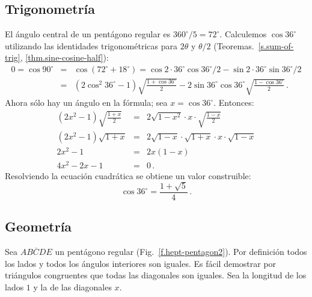 \subsection{Trigonometría}
El ángulo central de un pentágono regular es $360^\circ/5=72^\circ$. Calculemos $\cos 36^\circ$ utilizando las identidades trigonométricas para $2\theta$ y $\theta/2$ (Teoremas.~\ref{s.sum-of-trig}, \ref{thm.sine-cosine-half}):
\begin{eqnarray*}
0=\cos 90^\circ &=& \cos(72^\circ+18^\circ)=\cos 2\cdot 36^\circ\cos 36^\circ/2 - \sin 2\cdot 36^\circ\sin 36^\circ/2\\
&=&(2\cos^2 36^\circ-1)\sqrt{\frac{1+\cos 36^\circ}{2}}-2\sin 36^\circ\cos 36^\circ\sqrt{\frac{1-\cos 36^\circ}{2}}\,.
\end{eqnarray*}
Ahora sólo hay un ángulo en la fórmula; sea $x=\cos 36^\circ$. Entonces:
\begin{eqnarray*}
(2x^2-1)\sqrt{\frac{1+x}{2}}&=&2\sqrt{1-x^2}\cdot x \cdot \sqrt{\frac{1-x}{2}}\\
(2x^2-1)\sqrt{1+x}&=&2\sqrt{1-x}\cdot\sqrt{1+x}\cdot x \cdot \sqrt{1-x}\\
2x^2-1&=&2x(1-x)\\
4x^2-2x-1&=&0\,.
\end{eqnarray*}
Resolviendo la ecuación cuadrática se obtiene un valor construible:
\[
\cos 36^\circ = \frac{1+\sqrt{5}}{4}\,.
\]

\subsection{Geometría}\label{s.geometry-pentagon}

Sea $\overline{ABCDE}$ un pentágono regular (Fig.~\ref{f.hept-pentagon2}). Por definición todos los lados y todos los ángulos interiores son iguales. Es fácil demostrar por triángulos congruentes que todas las diagonales son iguales. Sea la longitud de los lados $1$ y la de las diagonales $x$.

